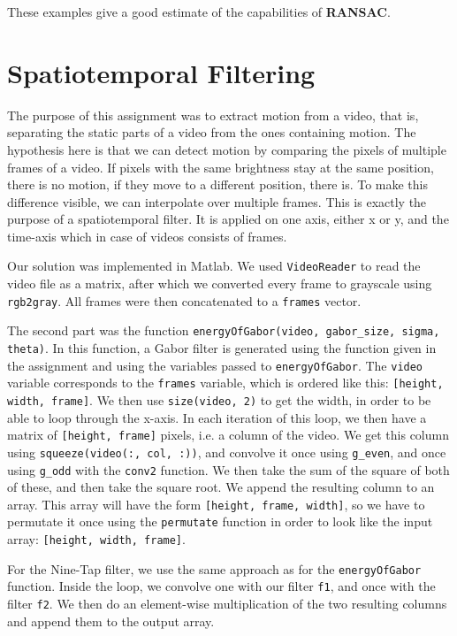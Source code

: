\documentclass{article}
\begin{document}
  These examples give a good estimate of the capabilities of \textbf{RANSAC}.


  \newpage

  \section{Spatiotemporal Filtering}

  The purpose of this assignment was to extract motion from a video, that is, separating the static parts of a video from the ones containing motion. The hypothesis here is that we can detect motion by comparing the pixels of multiple frames of a video. If pixels with the same brightness stay at the same position, there is no motion, if they move to a different position, there is. To make this difference visible, we can interpolate over multiple frames. This is exactly the purpose of a spatiotemporal filter. It is applied on one axis, either x or y, and the time-axis which in case of videos consists of frames.

  Our solution was implemented in Matlab. We used \texttt{VideoReader} to read the video file as a matrix, after which we converted every frame to grayscale using \texttt{rgb2gray}. All frames were then concatenated to a \texttt{frames} vector.

  The second part was the function \texttt{energyOfGabor(video, gabor\_size, sigma, theta)}. In this function, a Gabor filter is generated using the function given in the assignment and using the variables passed to \texttt{energyOfGabor}. The \texttt{video} variable corresponds to the \texttt{frames} variable, which is ordered like this: \texttt{[height, width, frame]}. We then use \texttt{size(video, 2)} to get the width, in order to be able to loop through the x-axis. In each iteration of this loop, we then have a matrix of \texttt{[height, frame]} pixels, i.e. a column of the video. We get this column using \texttt{squeeze(video(:, col, :))}, and convolve it once using \texttt{g\_even}, and once using \texttt{g\_odd} with the \texttt{conv2} function. We then take the sum of the square of both of these, and then take the square root. We append the resulting column to an array. This array will have the form \texttt{[height, frame, width]}, so we have to permutate it once using the \texttt{permutate} function in order to look like the input array: \texttt{[height, width, frame]}.

  For the Nine-Tap filter, we use the same approach as for the \texttt{energyOfGabor} function. Inside the loop, we convolve one with our filter \texttt{f1}, and once with the filter \texttt{f2}. We then do an element-wise multiplication of the two resulting columns and append them to the output array.
\end{document}
